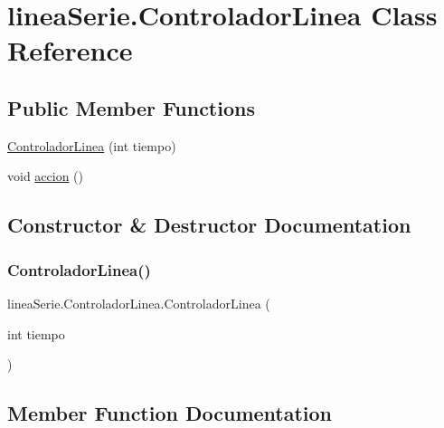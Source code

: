 \hypertarget{classlinea_serie_1_1_controlador_linea}{}\section{linea\+Serie.\+Controlador\+Linea Class Reference}
\label{classlinea_serie_1_1_controlador_linea}
\subsection*{Public Member Functions}
\begin{DoxyCompactItemize}
\item 
\mbox{\hyperlink{classlinea_serie_1_1_controlador_linea_ae5ef645b5ed72aaea20bb2bb08abcbe2}{Controlador\+Linea}} (int tiempo)
\item 
void \mbox{\hyperlink{classlinea_serie_1_1_controlador_linea_a91202ff011b835f7c845129d49449bb3}{accion}} ()
\end{DoxyCompactItemize}


\subsection{Constructor \& Destructor Documentation}
\mbox{\label{classlinea_serie_1_1_controlador_linea_ae5ef645b5ed72aaea20bb2bb08abcbe2}} 
\subsubsection{\texorpdfstring{Controlador\+Linea()}{ControladorLinea()}}
{\footnotesize\ttfamily linea\+Serie.\+Controlador\+Linea.\+Controlador\+Linea (\begin{DoxyParamCaption}\item[{int}]{tiempo }\end{DoxyParamCaption})}



\subsection{Member Function Documentation}
\mbox{\label{classlinea_serie_1_1_controlador_linea_a91202ff011b835f7c845129d49449bb3}} 
